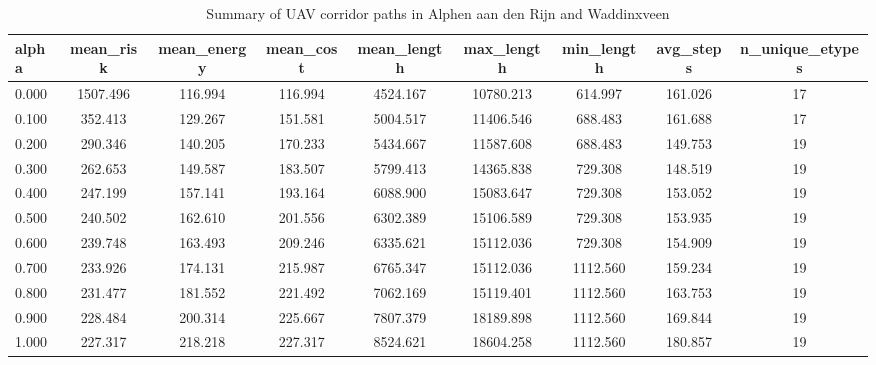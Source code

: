 \begin{table}
\caption{Summary of UAV corridor paths in Alphen aan den Rijn and Waddinxveen}
\label{tab:alphen_waddinxveen_summary}
\begin{tabular}{lcccccccc}
\toprule
alpha & mean_risk & mean_energy & mean_cost & mean_length & max_length & min_length & avg_steps & n_unique_etypes \\
\midrule
0.000 & 1507.496 & 116.994 & 116.994 & 4524.167 & 10780.213 & 614.997 & 161.026 & 17 \\
0.100 & 352.413 & 129.267 & 151.581 & 5004.517 & 11406.546 & 688.483 & 161.688 & 17 \\
0.200 & 290.346 & 140.205 & 170.233 & 5434.667 & 11587.608 & 688.483 & 149.753 & 19 \\
0.300 & 262.653 & 149.587 & 183.507 & 5799.413 & 14365.838 & 729.308 & 148.519 & 19 \\
0.400 & 247.199 & 157.141 & 193.164 & 6088.900 & 15083.647 & 729.308 & 153.052 & 19 \\
0.500 & 240.502 & 162.610 & 201.556 & 6302.389 & 15106.589 & 729.308 & 153.935 & 19 \\
0.600 & 239.748 & 163.493 & 209.246 & 6335.621 & 15112.036 & 729.308 & 154.909 & 19 \\
0.700 & 233.926 & 174.131 & 215.987 & 6765.347 & 15112.036 & 1112.560 & 159.234 & 19 \\
0.800 & 231.477 & 181.552 & 221.492 & 7062.169 & 15119.401 & 1112.560 & 163.753 & 19 \\
0.900 & 228.484 & 200.314 & 225.667 & 7807.379 & 18189.898 & 1112.560 & 169.844 & 19 \\
1.000 & 227.317 & 218.218 & 227.317 & 8524.621 & 18604.258 & 1112.560 & 180.857 & 19 \\
\bottomrule
\end{tabular}
\end{table}
